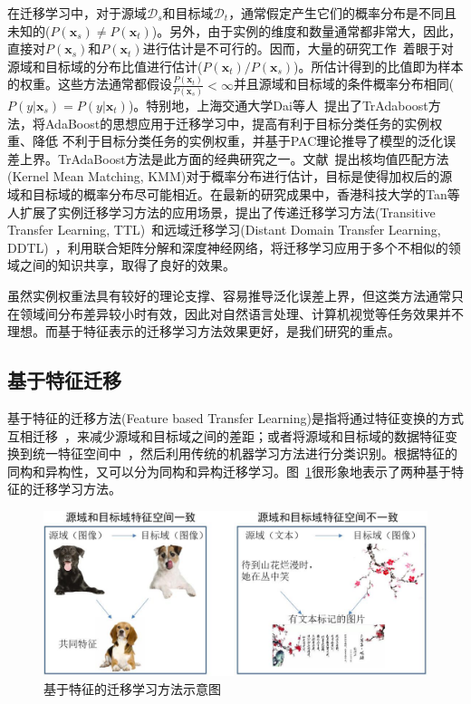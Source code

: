 在迁移学习中，对于源域$\mathcal{D}_s$和目标域$\mathcal{D}_t$，通常假定产生它们的概率分布是不同且未知的($P(\mathbf{x}_s) \ne P(\mathbf{x}_t)$)。另外，由于实例的维度和数量通常都非常大，因此，直接对$P(\mathbf{x}_s)$和$P(\mathbf{x}_t)$进行估计是不可行的。因而，大量的研究工作~\cite{khan2016adapting,zadrozny2004learning,cortes2008sample,dai2007boosting,tan2015transitive,tan2017distant}着眼于对源域和目标域的分布比值进行估计($P(\mathbf{x}_t)/P(\mathbf{x}_s)$)。所估计得到的比值即为样本的权重。这些方法通常都假设$\frac{P(\mathbf{x}_t)}{P(\mathbf{x}_s)}<\infty$并且源域和目标域的条件概率分布相同($P(y|\mathbf{x}_s)=P(y|\mathbf{x}_t)$)。特别地，上海交通大学Dai等人~\cite{dai2007boosting}提出了TrAdaboost方法，将AdaBoost的思想应用于迁移学习中，提高有利于目标分类任务的实例权重、降低
不利于目标分类任务的实例权重，并基于PAC理论推导了模型的泛化误差上界。TrAdaBoost方法是此方面的经典研究之一。文献~\cite{huang2007correcting}提出核均值匹配方法(Kernel Mean Matching, KMM)对于概率分布进行估计，目标是使得加权后的源域和目标域的概率分布尽可能相近。在最新的研究成果中，香港科技大学的Tan等人扩展了实例迁移学习方法的应用场景，提出了传递迁移学习方法(Transitive Transfer Learning, TTL)~\cite{tan2015transitive}和远域迁移学习(Distant Domain Transfer Learning, DDTL)~\cite{tan2017distant}，利用联合矩阵分解和深度神经网络，将迁移学习应用于多个不相似的领域之间的知识共享，取得了良好的效果。

虽然实例权重法具有较好的理论支撑、容易推导泛化误差上界，但这类方法通常只在领域间分布差异较小时有效，因此对自然语言处理、计算机视觉等任务效果并不理想。而基于特征表示的迁移学习方法效果更好，是我们研究的重点。

\subsection{基于特征迁移}

基于特征的迁移方法(Feature based Transfer Learning)是指将通过特征变换的方式互相迁移~\cite{liu2011cross,zheng2008transferring,hu2011transfer}，来减少源域和目标域之间的差距；或者将源域和目标域的数据特征变换到统一特征空间中~\cite{pan2011domain,long2014transfer,duan2012domain}，然后利用传统的机器学习方法进行分类识别。根据特征的同构和异构性，又可以分为同构和异构迁移学习。图~\ref{fig-method-feature}很形象地表示了两种基于特征的迁移学习方法。

\begin{figure}[htbp]
	\centering
	\includegraphics[scale=0.4]{./figures/fig-method-feature.pdf}
	\caption{基于特征的迁移学习方法示意图}
	\label{fig-method-feature}
\end{figure}

